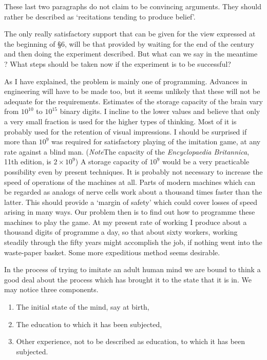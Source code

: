 \documentclass[10pt]{article} %
\begin{document}
These last two paragraphs do not claim to be convincing arguments. They should rather be described as `recitations tending to produce belief'.

The only really satisfactory support that can be given for the view expressed at the beginning of \S 6, will be that provided by waiting for the end of the century and then doing the experiment described. But what can we say in the meantime ? What steps should be taken now if the experiment is to be successful?

As I have explained, the problem is mainly one of programming. Advances in engineering will have to be made too, but it seems unlikely that these will not be adequate for the requirements. Estimates of the storage capacity of the brain vary from $10^{10}$ to $10^{15}$ binary digits. I incline to the lower values and believe that only a very small fraction is used for the higher types of thinking. Most of it is probably used for the retention of visual impressions. I should be surprised if more than $10^9$ was required for satisfactory playing of the imitation game, at any rate against a blind man. (\textit{Note}\textemdash The capacity of the \textit{Encyclopaedia Britannica}, 11th edition, is $2 \times 10^9$) A storage capacity of $10^9$ would be a very practicable possibility even by present techniques. It is probably not necessary to increase the speed of operations of the machines at all. Parts of modern machines which can be regarded as analogs of nerve cells work about a thousand times faster than the latter. This should provide a `margin of safety' which could cover losses of speed arising in many ways. Our problem then is to find out how to programme these machines to play the game. At my present rate of working I produce about a thousand digits of programme a day, so that about sixty workers, working steadily through the fifty years might accomplish the job, if nothing went into the waste-paper basket. Some more expeditious method seems desirable.

In the process of trying to imitate an adult human mind we are bound to think a good deal about the process which has brought it to the state that it is in. We may notice three components.
\begin{enumerate}[label=(\alph*)] %
    \item The initial state of the mind, say at birth,
    \item The education to which it has been subjected,
    \item Other experience, not to be described as education, to which it has been subjected.
\end{enumerate}
\end{document}
